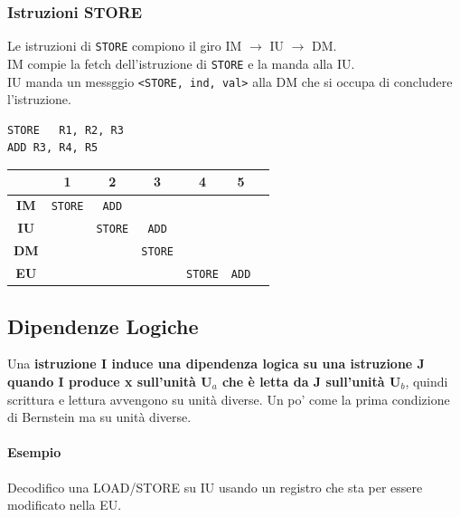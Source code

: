 \documentclass[10pt]{report}
\begin{document}
\subsubsection{Istruzioni STORE}
Le istruzioni di \texttt{STORE} compiono il giro IM $\rightarrow$ IU $\rightarrow$ DM.\\
IM compie la fetch dell'istruzione di \texttt{STORE} e la manda alla IU.\\
IU manda un messggio \texttt{<STORE, ind, val>} alla DM che si occupa di concludere l'istruzione.
\begin{multicols}{2}
\begin{lstlisting}
STORE	R1, R2, R3
ADD	R3, R4, R5
\end{lstlisting}
\columnbreak

\begin{tabular}{c|c|c|c|c|c|c|}
	 & 1 & 2 & 3 & 4 & 5 & \\
	\hline
	\textbf{IM} & \texttt{STORE} & \texttt{ADD} & & & & \\
	\hline
	\textbf{IU} & & \texttt{STORE} & \texttt{ADD} & & & \\
	\hline
	\textbf{DM} & & & \texttt{STORE} & & & \\
	\hline
	\textbf{EU} & & & &\texttt{STORE} & \texttt{ADD}  & \\
	\hline
\end{tabular}
\end{multicols}
\pagebreak
\subsection{Dipendenze Logiche}
Una \textbf{istruzione I induce una dipendenza logica su una istruzione J quando I produce x sull'unità U$_a$ che è letta da J sull'unità U$_b$}, quindi scrittura e lettura avvengono su unità diverse. Un po' come la prima condizione di Bernstein ma su unità diverse.
\paragraph{Esempio} Decodifico una LOAD/STORE su IU usando un registro che sta per essere modificato nella EU.
\end{document}
